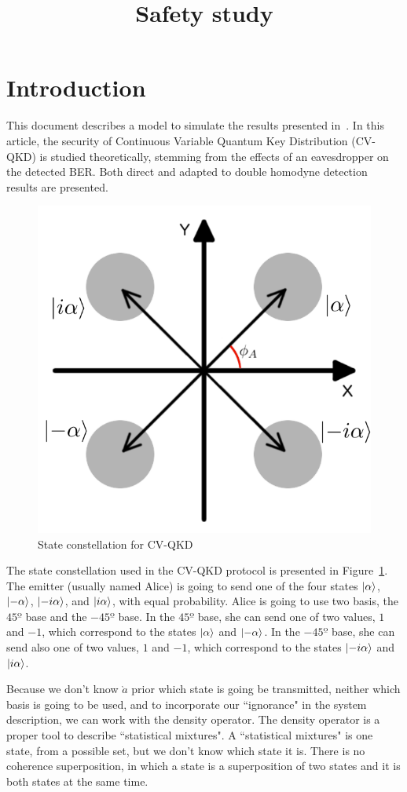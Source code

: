 \documentclass[a4paper]{article}
\title{Safety study}
\author{}
\date{}
\begin{document}
\maketitle

\section{Introduction}\label{sec:intro}

This document describes a model to simulate the results presented in~\cite{namiki2003security}. In this article, the security of Continuous Variable Quantum Key Distribution (CV-QKD) is studied theoretically, stemming from the effects of an eavesdropper on the detected BER. Both direct and adapted to double homodyne detection results are presented.

\begin{figure}[h]
\centering
\includegraphics[width=.5\linewidth]{constellation.png}
\caption{State constellation for CV-QKD}
\label{fig:const}
\end{figure}

The state constellation used in the CV-QKD protocol is presented in Figure~\ref{fig:const}.
The emitter (usually named Alice) is going to send one of the four states $\ket{\alpha}$, $\ket{-\alpha}$, $\ket{-i\alpha}$, and $\ket{i\alpha}$, with equal probability. 
Alice is going to use two basis, the $45º$ base and the $-45º$ base.
In the $45º$ base, she can send one of two values, $1$ and $-1$, which correspond to the states $\ket{\alpha}$ and $\ket{-\alpha}$.
In the $-45º$ base, she can send also one of two values, $1$ and $-1$, which correspond to the states $\ket{-i\alpha}$ and $\ket{i\alpha}$.


Because we don't know $\grave{a}$ prior which state is going be transmitted, neither which basis is going to be used, and to incorporate our ``ignorance" in the system description, we can work with the density operator. The density operator is a proper tool to describe ``statistical mixtures". A ``statistical mixtures" is one state, from a possible set, but we don't know which state it is. There is no coherence superposition, in which a state is a superposition of two states and it is both states at the same time.
\end{document}
